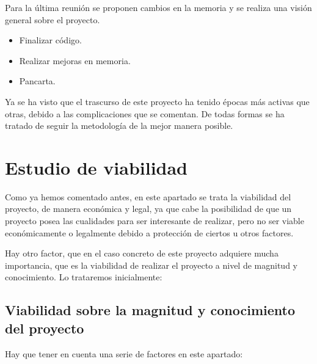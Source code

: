 Para la última reunión se proponen cambios en la memoria y se realiza una visión general sobre el proyecto.

\begin{itemize}
\item Finalizar código.
\item Realizar mejoras en memoria.
\item Pancarta.
\end{itemize}


Ya se ha visto que el trascurso de este proyecto ha tenido épocas más activas que otras, debido a las complicaciones que se comentan. De todas formas se ha tratado de seguir la metodología de la mejor manera posible.

\section{Estudio de viabilidad}

Como ya hemos comentado antes, en este apartado se trata la viabilidad del proyecto, de manera económica y legal, ya que cabe la posibilidad de que un proyecto posea las cualidades para ser interesante de realizar, pero no ser viable económicamente o legalmente debido a protección de ciertos u otros factores.

Hay otro factor, que en el caso concreto de este proyecto adquiere mucha importancia, que es la viabilidad de realizar el proyecto a nivel de magnitud y conocimiento. Lo trataremos inicialmente:

\subsection{Viabilidad sobre la magnitud y conocimiento del proyecto}

Hay que tener en cuenta una serie de factores en este apartado:

